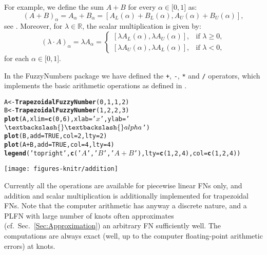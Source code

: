 \documentclass[11pt]{article}\usepackage{graphicx, color}
\makeatletter
\newcommand{\hlfunctioncall}[1]{\textcolor[rgb]{0.501960784313725,0,0.329411764705882}{\textbf{#1}}}%
\newcommand{\hlstring}[1]{\textcolor[rgb]{0.6,0.6,1}{#1}}%
\newenvironment{kframe}{%
 \def\at@end@of@kframe{}%
 \ifinner\ifhmode%
  \def\at@end@of@kframe{\end{minipage}}%
  \begin{minipage}{\columnwidth}%
 \fi\fi%
 \def\FrameCommand##1{\hskip\@totalleftmargin \hskip-\fboxsep
 \colorbox{shadecolor}{##1}\hskip-\fboxsep
     \hskip-\linewidth \hskip-\@totalleftmargin \hskip\columnwidth}%
 \MakeFramed {\advance\hsize-\width
   \@totalleftmargin\z@ \linewidth\hsize
   \@setminipage}}%
 {\par\unskip\endMakeFramed%
 \at@end@of@kframe}
\newenvironment{knitrout}{}{} %
\newcommand{\package}[1]{\textsf{#1}\xspace}
\makeatother
\begin{document}
For example, we define the sum $A+B$  for every
$\alpha \in \lbrack 0,1]$ as:%
\[
\left( A+B\right) _{\alpha }=A_{\alpha }+B_{\alpha }=\left[ A_{L}\left(
\alpha \right) +B_{L}\left( \alpha \right) ,A_{U}\left( \alpha \right)
+B_{U}\left( \alpha \right) \right],
\]%
see \cite{DuboisPrade1978,DiamondKloeden1994}.
Moreover, for $\lambda \in \mathbb{R}$,
the scalar multiplication is given by:
\[
\left( \lambda \cdot A\right) _{\alpha }=\lambda A_{\alpha }=\left\{ 
\begin{array}{ll}
\left[ \lambda A_{L}\left( \alpha \right) ,\lambda A_{U}\left( \alpha
\right) \right] , & \text{if }\lambda \geq 0, \\ 
\left[ \lambda A_{U}\left( \alpha \right) ,\lambda A_{L}\left( \alpha
\right) \right] , & \text{if }\lambda <0,%
\end{array}%
\right. 
\]%
for each $\alpha \in \lbrack 0,1]$.



In the \package{FuzzyNumbers} package we have defined
the \texttt{+}, \texttt{-}, \texttt{*} and \texttt{/} operators,
which implements the basic arithmetic operations
as defined in \cite{KlirYuan1995:fuzzybook}.


\begin{knitrout}\small
{}\color{fgcolor}\begin{kframe}
\begin{alltt}
A <- \hlfunctioncall{TrapezoidalFuzzyNumber}(0, 1, 1, 2)
B <- \hlfunctioncall{TrapezoidalFuzzyNumber}(1, 2, 2, 3)
\hlfunctioncall{plot}(A, xlim=\hlfunctioncall{c}(0,6), xlab=\hlstring{'$x$'}, ylab=\hlstring{'$\textbackslash{}\textbackslash{}alpha$'})
\hlfunctioncall{plot}(B, add=TRUE, col=2, lty=2)
\hlfunctioncall{plot}(A+B, add=TRUE, col=4, lty=4)
\hlfunctioncall{legend}(\hlstring{'topright'}, \hlfunctioncall{c}(\hlstring{'$A$'}, \hlstring{'$B$'}, \hlstring{'$A+B$'}), lty=\hlfunctioncall{c}(1,2,4), col=\hlfunctioncall{c}(1,2,4))
\end{alltt}
\end{kframe}

{\centering \texttt{[image: figures-knitr/addition]} 

}



\end{knitrout}



Currently all the operations are available
for piecewise linear FNs only,
and addition and scalar multiplication
is additionally implemented for trapezoidal FNs.
Note that the computer arithmetic has anyway
a discrete nature, and a PLFN with large number
of knots often approximates (cf.~Sec.~\ref{Sec:Approximation})
an arbitrary FN sufficiently well.
The computations are always exact (well, up to the computer
floating-point arithmetic errors) at knots.
\end{document}
